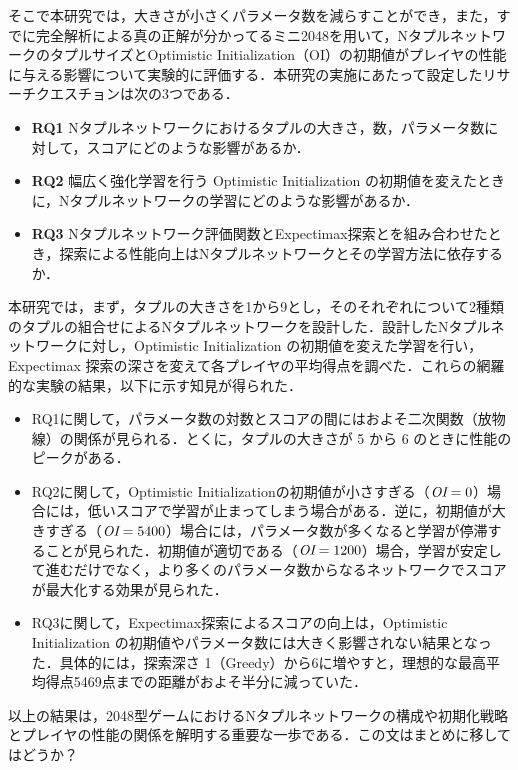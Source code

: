 そこで本研究では，大きさが小さくパラメータ数を減らすことができ，また，すでに完全解析による真の正解が分かってるミニ2048を用いて，NタプルネットワークのタプルサイズとOptimistic Initialization（OI）の初期値がプレイヤの性能に与える影響について実験的に評価する．本研究の実施にあたって設定したリサーチクエスチョンは次の3つである．
\begin{itemize}
\item \textbf{RQ1} Nタプルネットワークにおけるタプルの大きさ，数，パラメータ数に対して，スコアにどのような影響があるか．
\item \textbf{RQ2} 幅広く強化学習を行う Optimistic Initialization の初期値を変えたときに，Nタプルネットワークの学習にどのような影響があるか．
\item \textbf{RQ3} Nタプルネットワーク評価関数とExpectimax探索とを組み合わせたとき，探索による性能向上はNタプルネットワークとその学習方法に依存するか．
\end{itemize}

本研究では，まず，タプルの大きさを1から9とし，そのそれぞれについて2種類のタプルの組合せによるNタプルネットワークを設計した．設計したNタプルネットワークに対し，Optimistic Initialization の初期値を変えた学習を行い，Expectimax 探索の深さを変えて各プレイヤの平均得点を調べた．これらの網羅的な実験の結果，以下に示す知見が得られた．
\begin{itemize}
\item RQ1に関して，パラメータ数の対数とスコアの間にはおよそ二次関数（放物線）の関係が見られる．とくに，タプルの大きさが 5 から 6 のときに性能のピークがある．
\item RQ2に関して，Optimistic Initializationの初期値が小さすぎる（$\mbox{\itshape OI} = 0$）場合には，低いスコアで学習が止まってしまう場合がある．逆に，初期値が大きすぎる（$\mbox{\itshape OI} = 5400$）場合には，パラメータ数が多くなると学習が停滞することが見られた．初期値が適切である（$\mbox{\itshape OI} = 1200$）場合，学習が安定して進むだけでなく，より多くのパラメータ数からなるネットワークでスコアが最大化する効果が見られた．
\item RQ3に関して，Expectimax探索によるスコアの向上は，Optimistic Initialization の初期値やパラメータ数には大きく影響されない結果となった．具体的には，探索深さ  1（Greedy）から6に増やすと，理想的な最高平均得点5469点までの距離がおよそ半分に減っていた．
\end{itemize}

以上の結果は，2048型ゲームにおけるNタプルネットワークの構成や初期化戦略とプレイヤの性能の関係を解明する重要な一歩である．{\color{red}この文はまとめに移してはどうか？}
